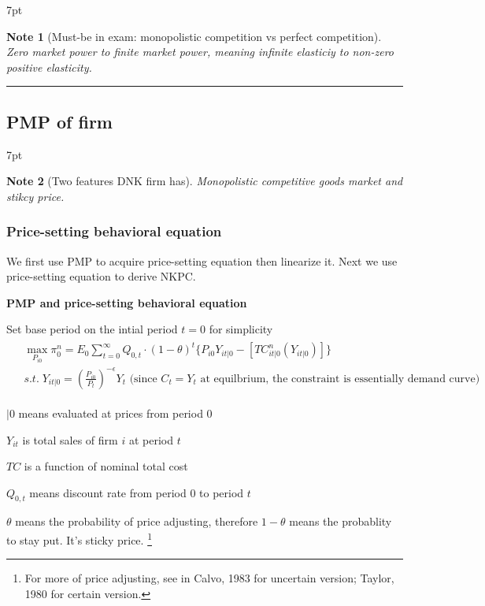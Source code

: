 \documentclass{article}
\newcommand*\sepline{%
  \begin{center}
    \rule[1ex]{.5\textwidth}{.5pt}
  \end{center}}
\newenvironment{blueblock}{
\def\FrameCommand{
  \hspace{1pt}
    {\color{DarkBlue}
    \vrule width 2pt}
    {\color{blueshade}
    \vrule width 4pt}
  \colorbox{blueshade}
}
\MakeFramed{
  \advance
  \hsize-
  \width
  \FrameRestore}
\noindent\hspace{-4.55pt}%
\begin{adjustwidth}{}{7pt}
\vspace{2pt}\vspace{2pt}
}
{\vspace{2pt}\end{adjustwidth}\endMakeFramed}
\newtheorem{note}{Note}
\begin{document}
\begin{blueblock}
\begin{note}[Must-be in exam: monopolistic competition vs perfect competition]
Zero market power to finite market power, meaning infinite elasticiy to non-zero positive elasticity.
\end{note}
\end{blueblock}

\sepline
\subsection{PMP of firm}

\begin{blueblock}
\begin{note}[Two features DNK firm has]
Monopolistic competitive goods market and stikcy price.
\end{note}
\end{blueblock}

\subsubsection{Price-setting behavioral equation}

We first use PMP to acquire price-setting equation then linearize it. Next we use price-setting equation to derive NKPC.

\textbf{PMP and price-setting behavioral equation}

Set base period on the intial period $t=0$ for simplicity
\begin{align}
\begin{split}&
\max_{P_{i0}}\pi_{0}^{n}=E_{0}\sum\limits_{t=0}^{\infty}Q_{0,t}\cdot (1-\theta)^{t}\{P_{i0}Y_{it | 0}-[T C^n_{it|0} (Y_{it|0})]\} 
\\&
s.t. \; Y_{it|0}=(\frac{P_{i0}}{P_{t}})^{-\epsilon}Y_{t} \text{ (since $C_t =Y_t$ at equilbrium, the constraint is essentially demand curve)}
\end{split}
\end{align}

$|0$ means evaluated at prices from period $0$

$Y_{it}$ is total sales of firm $i$ at period $t$

$TC$ is a function of nominal total cost

$Q_{0,t}$ means discount rate from period $0$ to period $t$

$\theta$ means the probability of price adjusting, therefore $1-\theta$ means the probablity to stay put. It's sticky price. 
\footnote{For more of price adjusting, see in Calvo, 1983 for uncertain version; Taylor, 1980 for certain version.}
\end{document}
